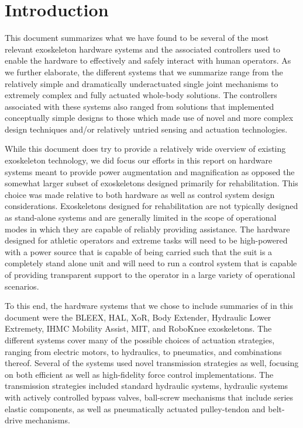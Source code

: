 \documentclass[letterpaper,12pt,fullpage]{article}
\begin{document}
\section{Introduction}

This document summarizes what we have found to be several of the most relevant exoskeleton hardware systems and the associated controllers used to enable the hardware to effectively and safely interact with human operators.  As we further elaborate, the different systems that we summarize range from the relatively simple and dramatically underactuated single joint mechanisms to extremely complex and fully actuated whole-body solutions.  The controllers associated with these systems also ranged from solutions that implemented conceptually simple designs to those which made use of novel and more complex design techniques and/or relatively untried sensing and actuation technologies. 

While this document does try to provide a relatively wide overview of existing exoskeleton technology, we did focus our efforts in this report on hardware systems meant to provide power augmentation and magnification as opposed the somewhat larger subset of exoskeletons designed primarily for rehabilitation.  This choice was made relative to both hardware as well as control system design considerations.  Exoskeletons designed for rehabilitation are not typically designed as stand-alone systems and are generally limited in the scope of operational modes in which they are capable of reliably providing assistance.  The hardware designed for athletic operators and extreme tasks will need to be high-powered with a power source that is capable of being carried such that the suit is a completely stand alone unit and will need to run a control system that is capable of providing transparent support to the operator in a large variety of operational scenarios.

To this end, the hardware systems that we chose to include summaries of in this document were the BLEEX, HAL, XoR, Body Extender, Hydraulic Lower Extremety, IHMC Mobility Assist, MIT, and RoboKnee exoskeletons.  The different systems cover many of the possible choices of actuation strategies, ranging from electric motors, to hydraulics, to pneumatics, and combinations thereof.  Several of the systems used novel transmission strategies as well, focusing on both efficient as well as high-fidelity force control implementations.  The transmission strategies included standard hydraulic systems, hydraulic systems with actively controlled bypass valves, ball-screw mechanisms that include series elastic components, as well as pneumatically actuated pulley-tendon and belt-drive mechanisms. 
\end{document}
